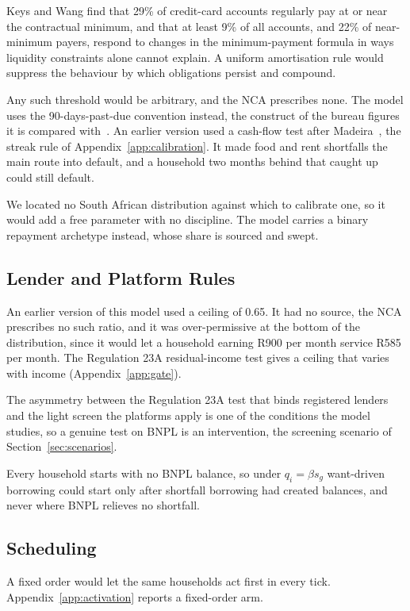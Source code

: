 Keys and Wang
\citeyearpar{Keys2019} find that 29\% of credit-card accounts regularly pay at or near the contractual minimum, and
that at least 9\% of all accounts, and 22\% of near-minimum payers, respond to changes in the
minimum-payment formula in ways liquidity constraints alone cannot explain. A uniform amortisation rule would
suppress the behaviour by which obligations persist and compound.

Any such
threshold would be arbitrary, and the \ac{NCA} prescribes none. The model uses the 90-days-past-due
convention instead, the construct of the bureau figures it is compared with~\citep{ncr_cbm_2017}. An
earlier version used a cash-flow test after Madeira~\citeyearpar{madeira2018chile}, the streak rule
of Appendix~\ref{app:calibration}. It made food and rent shortfalls the main route into default,
and a household two months behind that caught up could still default.

We located no South African distribution
against which to calibrate one, so it would add a free parameter with no discipline. The model
carries a binary repayment archetype instead, whose share is sourced and swept.

\subsection{Lender and Platform Rules}

An earlier version of this
model used a ceiling of 0.65. It had no source, the \ac{NCA} prescribes no such ratio, and it was
over-permissive at the bottom of the distribution, since it would let a household earning R900 per month service R585 per month. The
Regulation 23A residual-income test gives a ceiling that varies with income (Appendix~\ref{app:gate}).

The
asymmetry between the Regulation 23A test that binds registered lenders and the light screen
the platforms apply is one of the conditions the model studies, so a genuine test on
\ac{BNPL} is an intervention, the screening scenario of Section~\ref{sec:scenarios}.

Every household starts with no
\ac{BNPL} balance, so under $q_i = \beta s_g$ want-driven borrowing could start only after
shortfall borrowing had created balances, and never where \ac{BNPL} relieves no shortfall.

\subsection{Scheduling}

A fixed order would let the same households act
first in every tick. Appendix~\ref{app:activation} reports a fixed-order arm.
